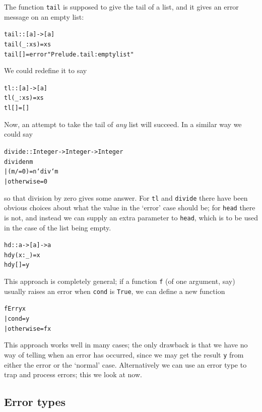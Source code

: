 The function \texttt{tail} is supposed to give the tail of a list, and it gives an
error message on an empty list:
\begin{alltt}
tail :: [a] -> [a]
tail (_:xs) = xs
tail []     = error "Prelude.tail: empty list"
\end{alltt}
We could redefine it to say
\begin{alltt}
tl :: [a] -> [a]
tl (_:xs) = xs
tl []     = []
\end{alltt}
Now, an attempt to take the tail of {\em any\/} list will succeed. In a
similar way we could say
\begin{alltt}
divide :: Integer -> Integer -> Integer
divide n m 
  | (m /= 0)    = n `div` m
  | otherwise   = 0
\end{alltt}
so that division by zero gives some answer. For \texttt{tl} and \texttt{divide}
there have been obvious choices about what the value in the `error' case
should be; for \texttt{head} there is not, and instead we can supply an extra
parameter to \texttt{head}, which is to be used in the case of the list being
empty.
\begin{alltt}
hd :: a -> [a] -> a
hd y (x:_) = x
hd y []    = y
\end{alltt}
This approach is completely general; if a function \texttt{f} (of one
argument, say) usually raises an error when \texttt{cond} is \texttt{True}, we can
define a new function
\begin{alltt}
fErr y x 
  | cond        = y
  | otherwise   = f x
\end{alltt}
This approach works well in many cases; the only drawback is that we have no
way of telling when an error has occurred, since we may get the result 
\texttt{y} from either the error or the `normal' case.
Alternatively we can use an error type to trap and process errors; this
we look at now.

\subsection*{Error types}

